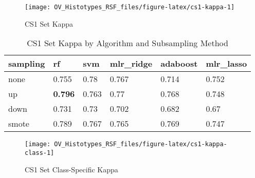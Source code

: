 \documentclass[
]{report}
\begin{document}
\begin{figure}[H]

{\centering \texttt{[image: OV\_Histotypes\_RSF\_files/figure-latex/cs1-kappa-1]} 

}

\caption{CS1 Set Kappa}\label{fig:cs1-kappa}
\end{figure}

\begin{table}

\caption{\label{tab:cs1-kappa-table}CS1 Set Kappa by Algorithm and Subsampling Method}
\centering
\begin{tabular}[t]{l|l|l|l|l|l}
\hline
sampling & rf & svm & mlr\_ridge & adaboost & mlr\_lasso\\
\hline
none & 0.755 & 0.78 & 0.767 & 0.714 & 0.752\\
\hline
up & \textbf{0.796} & 0.763 & 0.77 & 0.768 & 0.748\\
\hline
down & 0.731 & 0.73 & 0.702 & 0.682 & 0.67\\
\hline
smote & 0.789 & 0.767 & 0.765 & 0.769 & 0.747\\
\hline
\end{tabular}
\end{table}

\begin{figure}[H]

{\centering \texttt{[image: OV\_Histotypes\_RSF\_files/figure-latex/cs1-kappa-class-1]} 

}

\caption{CS1 Set Class-Specific Kappa}\label{fig:cs1-kappa-class}
\end{figure}
\end{document}
